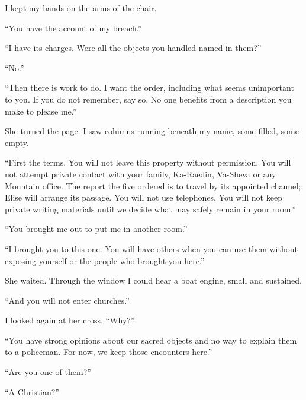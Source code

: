 I kept my hands on the arms of the chair.\par

``You have the account of my breach.''\par

``I have its charges. Were all the objects you handled named in them?''\par

``No.''\par

``Then there is work to do. I want the order, including what seems unimportant to you. If you do not remember, say so. No one benefits from a description you make to please me.''\par

She turned the page. I saw columns running beneath my name, some filled, some empty.\par

``First the terms. You will not leave this property without permission. You will not attempt private contact with your family, Ka-Raedin, Va-Sheva or any Mountain office. The report the five ordered is to travel by its appointed channel; Elise will arrange its passage. You will not use telephones. You will not keep private writing materials until we decide what may safely remain in your room.''\par

``You brought me out to put me in another room.''\par

``I brought you to this one. You will have others when you can use them without exposing yourself or the people who brought you here.''\par

She waited. Through the window I could hear a boat engine, small and sustained.\par

``And you will not enter churches.''\par

I looked again at her cross. ``Why?''\par

``You have strong opinions about our sacred objects and no way to explain them to a policeman. For now, we keep those encounters here.''\par

``Are you one of them?''\par

``A Christian?''\par

